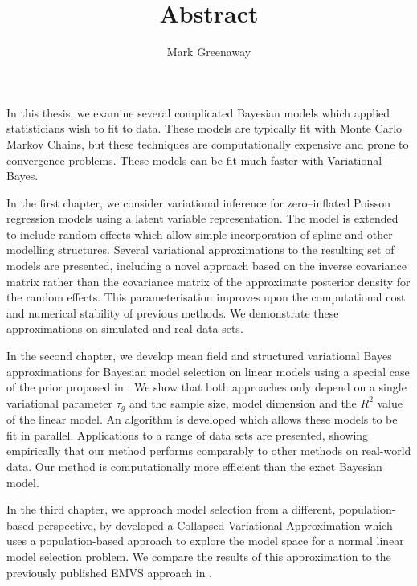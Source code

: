 \documentclass{article}
\title{Abstract}
\author{Mark Greenaway}
\begin{document}
\maketitle

In this thesis, we examine several complicated Bayesian models which applied statisticians wish to fit
to data. These models are typically fit with Monte Carlo Markov Chains, but these techniques are
computationally expensive and prone to convergence problems. These models can be fit much faster with Variational 
Bayes.

In the first chapter, we consider variational inference for zero--inflated Poisson regression models using a
latent   variable representation. The model is extended to include random effects which allow simple
incorporation of   spline and other modelling structures. Several variational approximations to the resulting
set of models are   presented, including a novel approach based on the inverse covariance matrix rather than
the covariance matrix   of the approximate posterior density for the random effects. This parameterisation
improves upon the   computational cost and numerical stability of previous methods. We demonstrate these
approximations on   simulated and real data sets.

In the second chapter, we develop mean field and structured variational Bayes approximations for Bayesian
model selection on linear models using a special case of the prior proposed in \cite{Maruyama2011}. We show
that both approaches only depend on a single variational parameter $\tau_g$ and the sample size, model
dimension and the $R^2$ value of the linear model. An algorithm is developed which allows these models to be
fit in parallel. Applications to a range of data sets are presented, showing  empirically that our method
performs comparably to other methods on real-world data. Our method is computationally more efficient  than
the exact Bayesian model.

In the third chapter, we approach model selection from a different, population-based perspective, by developed
a Collapsed Variational Approximation which uses a population-based approach to explore the model space for
a normal linear model selection problem. We compare the results of this approximation to the 
previously published EMVS approach in \cite{Rockova2014}.


\end{document}

